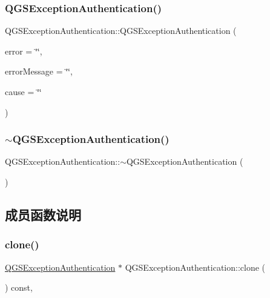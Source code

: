 \subsubsection{\texorpdfstring{Q\+G\+S\+Exception\+Authentication()}{QGSExceptionAuthentication()}}
{\footnotesize\ttfamily Q\+G\+S\+Exception\+Authentication\+::\+Q\+G\+S\+Exception\+Authentication (\begin{DoxyParamCaption}\item[{const Q\+String \&}]{error = {\ttfamily \char`\"{}\char`\"{}},  }\item[{const Q\+String \&}]{error\+Message = {\ttfamily \char`\"{}\char`\"{}},  }\item[{const Q\+String \&}]{cause = {\ttfamily \char`\"{}\char`\"{}} }\end{DoxyParamCaption})}

\mbox{\label{class_q_g_s_exception_authentication_a3ea673cea41fb7be34074e1f7ae95cd7}} 
\subsubsection{\texorpdfstring{$\sim$\+Q\+G\+S\+Exception\+Authentication()}{~QGSExceptionAuthentication()}}
{\footnotesize\ttfamily Q\+G\+S\+Exception\+Authentication\+::$\sim$\+Q\+G\+S\+Exception\+Authentication (\begin{DoxyParamCaption}{ }\end{DoxyParamCaption})\hspace{0.3cm}{\ttfamily [virtual]}}



\subsection{成员函数说明}
\mbox{\label{class_q_g_s_exception_authentication_a5e1cf8601b99ea8dc2525ec2063f3744}} 
\subsubsection{\texorpdfstring{clone()}{clone()}}
{\footnotesize\ttfamily \mbox{\hyperlink{class_q_g_s_exception_authentication}{Q\+G\+S\+Exception\+Authentication}} $\ast$ Q\+G\+S\+Exception\+Authentication\+::clone (\begin{DoxyParamCaption}{ }\end{DoxyParamCaption}) const\hspace{0.3cm}{\ttfamily [override]}, {\ttfamily [virtual]}}

